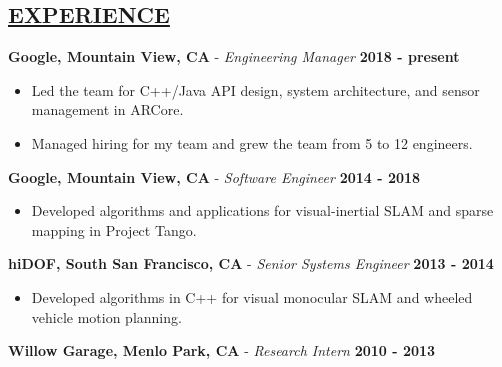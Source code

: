 \documentclass[line,margin]{res}
\newenvironment{compactlist}{
	\begin{itemize}\itemsep=0pt
}{
	\end{itemize}
}
\begin{document}

\address{164 Granada Dr, Mountain View, CA 94043}
\address{650.762.6844 $\mid$ adamleeper@gmail.com}
\address{github.com/aleeper}
\address{linkedin.com/in/adam-leeper}
\address{www.adamleeper.com}



\begin{resume}
%
\section{\underline{EXPERIENCE}}
\vspace{1.0pc}
{\bf Google, Mountain View, CA} - \emph{Engineering Manager}
  \hfill \textbf{2018 - present}
  \begin{compactlist}
    \item Led the team for C++/Java API design, system architecture, and
      sensor management in ARCore.
    \item Managed hiring for my team and grew the team from 5 to 12 engineers.
  \end{compactlist}
{\bf Google, Mountain View, CA} - \emph{Software Engineer}
  \hfill \textbf{2014 - 2018}
  \begin{compactlist}
    \item Developed algorithms and applications for
      visual-inertial SLAM and sparse mapping in Project Tango.
  \end{compactlist}
{\bf hiDOF, South San Francisco, CA} - \emph{Senior Systems Engineer}
  \hfill \textbf{2013 - 2014}
  \begin{compactlist}
    \item Developed algorithms in C++ for visual monocular SLAM and wheeled vehicle motion planning.
  \end{compactlist}
{\bf Willow Garage, Menlo Park, CA} - \emph{Research Intern}
  \hfill \textbf{2010 - 2013}
  \begin{compactlist}

\end{compactlist}
\end{resume}
\end{document}
